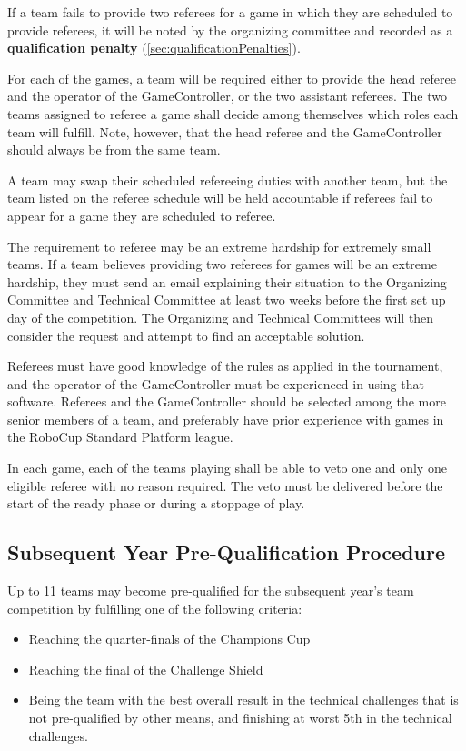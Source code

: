 If a team fails to provide two referees for a game in which they are scheduled to provide referees, it will be noted by the organizing committee and recorded as a \textbf{qualification penalty} (\cref{sec:qualificationPenalties}).

For each of the games, a team will be required either to provide the head referee and the operator of the GameController, or the two assistant referees.  The two teams assigned to referee a game shall decide among themselves which roles each team will fulfill. Note, however, that the head referee and the GameController should always be from the same team.

A team may swap their scheduled refereeing duties with another team, but the team listed on the referee schedule will be held accountable if referees fail to appear for a game they are scheduled to referee.

The requirement to referee may be an extreme hardship for extremely small teams.  If a team believes providing two referees for games will be an extreme hardship, they must send an email explaining their situation to the Organizing Committee and Technical Committee at least two weeks before the first set up day of the competition.  The Organizing and Technical Committees will then consider the request and attempt to find an acceptable solution.

Referees must have good knowledge of the rules as applied in the tournament, and the operator of the GameController must be experienced in using that software. Referees and the GameController should be selected among the more senior members of a team, and preferably have prior experience with games in the RoboCup Standard Platform league.

In each game, each of the teams playing shall be able to veto one and only one eligible referee with no reason required. The veto must be delivered before the start of the ready phase or during a stoppage of play.


\subsection{Subsequent Year Pre-Qualification Procedure}
\label{sec:preQual}
Up to 11 teams may become pre-qualified for the subsequent year's team competition by fulfilling one of the following criteria:
\begin{itemize}
    \item Reaching the quarter-finals of the Champions Cup
    \item Reaching the final of the Challenge Shield
    \item Being the team with the best overall result in the technical challenges that is not pre-qualified by other means, and finishing at worst 5th in the technical challenges.
\end{itemize}

